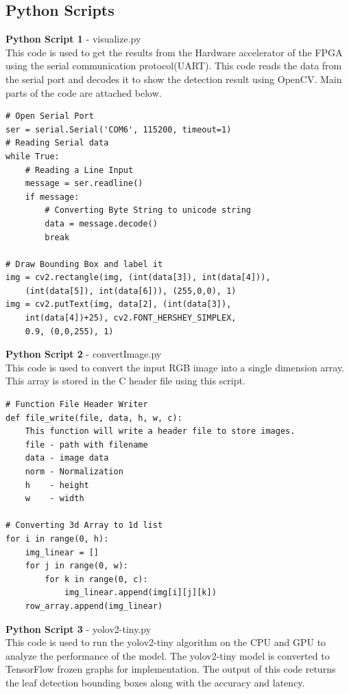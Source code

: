 \documentclass[a4paper,12pt,oneside]{book}
\begin{document}
\subsection*{Python Scripts}
\textbf{Python Script 1} - visualize.py\vspace{0.2cm}\\
This code is used to get the results from the Hardware accelerator of the FPGA using the serial communication protocol(UART). This code reads the data from the serial port and decodes it to show the detection result using OpenCV. Main parts of the code are attached below.\vspace{0.2cm}
\begin{lstlisting}
# Open Serial Port
ser = serial.Serial('COM6', 115200, timeout=1)
# Reading Serial data
while True:
    # Reading a Line Input
    message = ser.readline()
    if message:
        # Converting Byte String to unicode string 
        data = message.decode()
        break

# Draw Bounding Box and label it
img = cv2.rectangle(img, (int(data[3]), int(data[4])),
    (int(data[5]), int(data[6])), (255,0,0), 1)
img = cv2.putText(img, data[2], (int(data[3]),
    int(data[4])+25), cv2.FONT_HERSHEY_SIMPLEX,
    0.9, (0,0,255), 1)
\end{lstlisting}
\textbf{Python Script 2} - convertImage.py\vspace{0.2cm}\\
This code is used to convert the input RGB image into a single dimension array. This array is stored in the C header file using this script.\vspace{0.2cm}
\begin{lstlisting}
# Function File Header Writer
def file_write(file, data, h, w, c):
    This function will write a header file to store images.
    file - path with filename
    data - image data
    norm - Normalization
    h    - height
    w    - width

# Converting 3d Array to 1d list
for i in range(0, h):
    img_linear = []
    for j in range(0, w):
        for k in range(0, c):
            img_linear.append(img[i][j][k])
    row_array.append(img_linear)
\end{lstlisting}
\textbf{Python Script 3} - yolov2-tiny.py\vspace{0.2cm}\\
This code is used to run the yolov2-tiny algorithm on the CPU and GPU to analyze the performance of the model. The yolov2-tiny model is converted to TensorFlow frozen graphs for implementation. The output of this code returns the leaf detection bounding boxes along with the accuracy and latency.\vspace{0.2cm}
\end{document}
